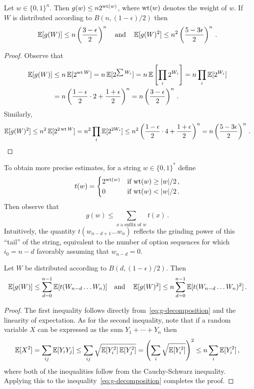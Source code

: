 
\begin{proposition}\label{prop:praos-moments-simple}
  Let $w \in \{0,1\}^n$. Then $g(w) \leq n 2^{\operatorname{wt}(w)}$, where $\operatorname{wt}(w)$ denotes the weight of $w$. If $W$ is distributed according to $B(n,(1 - \epsilon)/2)$ then
  \[
    \operatorname{\mathbb{E}}[g(W)] \leq n \left(\frac{3 - \epsilon}{2}\right)^n \quad\text{and}\quad\operatorname{\mathbb{E}}[g(W)^2] \leq n^2\left(\frac{5 - 3\epsilon}{2}\right)^n\,.
  \]
\end{proposition}

\begin{proof}
  Observe that
  \begin{align*}
    \operatorname{\mathbb{E}}[g(W)] 
    &\leq n\operatorname{\mathbb{E}}[2^{\operatorname{wt}{W}}] 
    = n\operatorname{\mathbb{E}}[2^{\sum W_i}] 
    = n\operatorname{\mathbb{E}}\left[\prod_i 2^{W_i}\right] 
    = n\prod_i \operatorname{\mathbb{E}}[2^{W_i}] \\
    &= n \left( \frac{1-\epsilon}{2} \cdot 2 + \frac{1 + \epsilon}{2}\right)^n 
    = n \left(\frac{3 - \epsilon}{2}\right)^n\,.
  \end{align*}
    Similarly,
  \[
    \operatorname{\mathbb{E}}[g(W)^2] \leq n^2 \operatorname{\mathbb{E}}[2^{2\operatorname{wt}{W}}] = n^2\prod_i \operatorname{\mathbb{E}}[2^{2W_i}] \leq n^2\left( \frac{1-\epsilon}{2} \cdot 4 + \frac{1 + \epsilon}{2}\right)^n = n \left(\frac{5 - 3\epsilon}{2}\right)^n\,.\qedhere
  \]
\end{proof}

To obtain more precise estimates, for a string $w \in \{0,1\}^*$ define
\[
  t(w) = \begin{cases}
    2^{\operatorname{wt}(w)} & \text{if $\operatorname{wt}(w) \geq |w|/2$\,,}\\
    0 & \text{if $\operatorname{wt}(w) < |w|/2$\,.}
  \end{cases}
\]
Then observe that
\begin{equation}\label{eq:g-decomposition}
  g(w) \leq \sum_{x\; \text{a suffix of $w$}} t(x)\,.
\end{equation}
Intuitively, the quantity $t(w_{n-d+1} \ldots w_n)$ reflects the grinding power of this ``tail'' of the string, equivalent to the number of option sequences for which $i_0 = n-d$ favorably assuming that $w_{n-d} = 0$.
\begin{proposition}\label{prop:moments-general}
  Let $W$ be distributed according to $B(d,(1 - \epsilon)/2)$. Then
  \[
    \operatorname{\mathbb{E}}[g(W)] \leq \sum_{d = 0}^{n-1} \operatorname{\mathbb{E}}[t(W_{n-d} \ldots W_n)] \quad \text{and}\quad \operatorname{\mathbb{E}}[g(W)^2] \leq n \sum_{d = 0}^{n-1} \operatorname{\mathbb{E}}[t(W_{n-d} \ldots W_n)^2]\,.
  \]
\end{proposition}

\begin{proof}
  The first inequality follows directly from~\eqref{eq:g-decomposition} and the linearity of
  expectation. As for the second inequality, note that if a random
  variable $X$ can be expressed as the sum $Y_1 + \cdots + Y_n$ then
  \[
    \operatorname{\mathbb{E}}[X^2] = \sum_{ij} \operatorname{\mathbb{E}}[Y_iY_j] \leq \sum_{ij} \sqrt{\operatorname{\mathbb{E}}[Y_i^2] \operatorname{\mathbb{E}}[Y_j^2]} = \left(\sum_i \sqrt{\operatorname{\mathbb{E}}[Y_i^2]} \right)^2 \leq n \sum_i \operatorname{\mathbb{E}}[Y_i^2]\,,
  \]
  where both of the inequalities follow from the Cauchy-Schwarz inequality.
  Applying this to the inequality~\eqref{eq:g-decomposition} completes the proof.
\end{proof}

